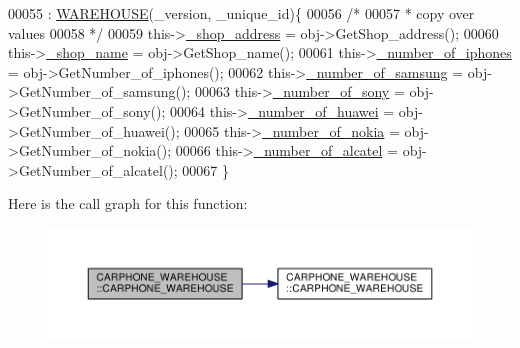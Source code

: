 \begin{DoxyCode}
00055                                                                                   : 
      \hyperlink{class_w_a_r_e_h_o_u_s_e_a7a924d389af91f54ed0e1d1d8d56ec57_a7a924d389af91f54ed0e1d1d8d56ec57}{WAREHOUSE}(\_version, \_unique\_id)\{
00056         \textcolor{comment}{/*}
00057 \textcolor{comment}{         * copy over values
}
00058 \textcolor{comment}{         */}
00059         this->\hyperlink{class_c_a_r_p_h_o_n_e___w_a_r_e_h_o_u_s_e_a085b59da7d9f351043de6398b98898a7_a085b59da7d9f351043de6398b98898a7}{\_shop\_address} = obj->GetShop\_address();
00060         this->\hyperlink{class_c_a_r_p_h_o_n_e___w_a_r_e_h_o_u_s_e_a4ac330ca32a05ae4391a00db62ca6128_a4ac330ca32a05ae4391a00db62ca6128}{\_shop\_name} = obj->GetShop\_name();
00061         this->\hyperlink{class_c_a_r_p_h_o_n_e___w_a_r_e_h_o_u_s_e_af8f016cde9df0070da24fb8804f3d6ca_af8f016cde9df0070da24fb8804f3d6ca}{\_number\_of\_iphones} = obj->GetNumber\_of\_iphones();
00062         this->\hyperlink{class_c_a_r_p_h_o_n_e___w_a_r_e_h_o_u_s_e_a6ee4003dc7303c7df17f67a26556bdf0_a6ee4003dc7303c7df17f67a26556bdf0}{\_number\_of\_samsung} = obj->GetNumber\_of\_samsung();
00063         this->\hyperlink{class_c_a_r_p_h_o_n_e___w_a_r_e_h_o_u_s_e_acf5bfebe1b5427a0b932f0cdc3b1ccdb_acf5bfebe1b5427a0b932f0cdc3b1ccdb}{\_number\_of\_sony} = obj->GetNumber\_of\_sony();
00064         this->\hyperlink{class_c_a_r_p_h_o_n_e___w_a_r_e_h_o_u_s_e_a4bf36b969e0873142ecac780d6f240bf_a4bf36b969e0873142ecac780d6f240bf}{\_number\_of\_huawei} = obj->GetNumber\_of\_huawei();
00065         this->\hyperlink{class_c_a_r_p_h_o_n_e___w_a_r_e_h_o_u_s_e_a05e0c6f134857e06bdf9e6ae71eb9b4e_a05e0c6f134857e06bdf9e6ae71eb9b4e}{\_number\_of\_nokia} = obj->GetNumber\_of\_nokia();
00066         this->\hyperlink{class_c_a_r_p_h_o_n_e___w_a_r_e_h_o_u_s_e_a7e089af48a2a409a8d348d81f65d9193_a7e089af48a2a409a8d348d81f65d9193}{\_number\_of\_alcatel} = obj->GetNumber\_of\_alcatel();
00067     \}
\end{DoxyCode}


Here is the call graph for this function\+:\nopagebreak
\begin{figure}[H]
\begin{center}
\leavevmode
\includegraphics[width=350pt]{class_c_a_r_p_h_o_n_e___w_a_r_e_h_o_u_s_e_a131eb8df5342de81022b166f40f94d92_a131eb8df5342de81022b166f40f94d92_cgraph}
\end{center}
\end{figure}


